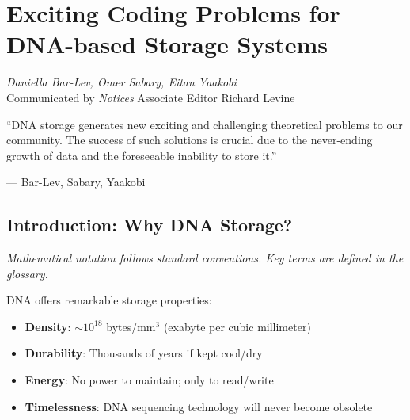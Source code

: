 \chapter{Exciting Coding Problems for DNA-based Storage Systems}
\label{ch:dna_storage}

\begin{flushright}
\textit{Daniella Bar-Lev, Omer Sabary, Eitan Yaakobi}\\
Communicated by \textit{Notices} Associate Editor Richard Levine
\end{flushright}

\epigraph{``DNA storage generates new exciting and challenging theoretical problems to our community. The success of such solutions is crucial due to the never-ending growth of data and the foreseeable inability to store it.''}{--- Bar-Lev, Sabary, Yaakobi} \cite{barlev2022dna}

\begin{abstract}
DNA storage offers ultra-dense, durable data archiving but introduces a unique error model: insertions, deletions, and substitutions (edit errors), unordered strands with massive redundancy, and constrained sequences (GC-content, homopolymers). This chapter surveys the coding theory challenges: edit-distance codes, clustering algorithms, sequence reconstruction, and constrained codes, \cite{barlev2022dna}.
\end{abstract}

\section{Introduction: Why DNA Storage?}

\noindent\textit{Mathematical notation follows standard conventions. Key terms are defined in the glossary.}\n
\label{sec:dna:intro}

DNA offers remarkable storage properties:
\begin{itemize}
    \item \textbf{Density}: $\sim 10^{18}$ bytes/mm$^3$ (exabyte per cubic millimeter)
    \item \textbf{Durability}: Thousands of years if kept cool/dry
    \item \textbf{Energy}: No power to maintain; only to read/write
    \item \textbf{Timelessness}: DNA sequencing technology will never become obsolete
\end{itemize}

